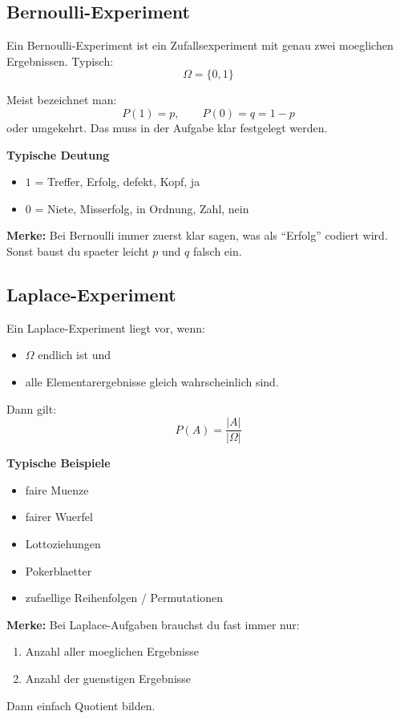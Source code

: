 \documentclass[a4paper,11pt]{article}
\begin{document}
\subsection{Bernoulli-Experiment}
Ein Bernoulli-Experiment ist ein Zufallsexperiment mit genau zwei moeglichen Ergebnissen.
Typisch:
\[
\Omega = \{0,1\}
\]

Meist bezeichnet man:
\[
P(1) = p, \qquad P(0) = q = 1-p
\]
oder umgekehrt. Das muss in der Aufgabe klar festgelegt werden.

\textbf{Typische Deutung}
\begin{itemize}
  \item $1$ = Treffer, Erfolg, defekt, Kopf, ja
  \item $0$ = Niete, Misserfolg, in Ordnung, Zahl, nein
\end{itemize}

\textbf{Merke:}
Bei Bernoulli immer zuerst klar sagen, was als ``Erfolg'' codiert wird. Sonst baust du spaeter leicht $p$ und $q$ falsch ein.

\subsection{Laplace-Experiment}
Ein Laplace-Experiment liegt vor, wenn:
\begin{itemize}
  \item $\Omega$ endlich ist und
  \item alle Elementarergebnisse gleich wahrscheinlich sind.
\end{itemize}

Dann gilt:
\[
P(A) = \frac{|A|}{|\Omega|}
\]

\textbf{Typische Beispiele}
\begin{itemize}
  \item faire Muenze
  \item fairer Wuerfel
  \item Lottoziehungen
  \item Pokerblaetter
  \item zufaellige Reihenfolgen / Permutationen
\end{itemize}

\textbf{Merke:}
Bei Laplace-Aufgaben brauchst du fast immer nur:
\begin{enumerate}
  \item Anzahl aller moeglichen Ergebnisse
  \item Anzahl der guenstigen Ergebnisse
\end{enumerate}
Dann einfach Quotient bilden.
\end{document}
